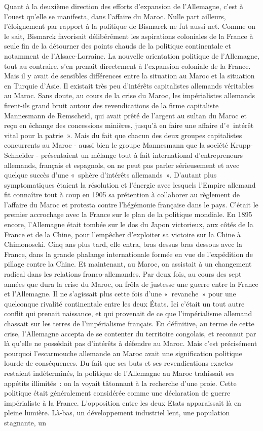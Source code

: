 \documentclass[french,twoside]{book} %
\begin{document}
Quant à la deuxième direction des efforts d’expansion de l’Allemagne, c’est à l’ouest qu’elle se manifesta, dans l’affaire du Maroc. Nulle part ailleurs, l’éloignement par rapport à la politique de Bismarck ne fut aussi net. Comme on le sait, Bismarck favorisait délibérément les aspirations coloniales de la France à seule fin de la détourner des points chauds de la politique continentale et notamment de l’Alsace-Lorraine. La nouvelle orientation politique de l’Allemagne, tout au contraire, s’en prenait directement à l’expansion coloniale de la France. Mais il y avait de sensibles différences entre la situation au Maroc et la situation en Turquie d’Asie. Il existait très peu d’intérêts capitalistes allemands véritables au Maroc. Sans doute, au cours de la crise du Maroc, les impérialistes allemands firent-ils grand bruit autour des revendications de la firme capitaliste Mannesmann de Remscheid, qui avait prêté de l’argent au sultan du Maroc et reçu en échange des concessions minières, jusqu’à en faire une affaire d’« intérêt vital pour la patrie ». Mais du fait que chacun des deux groupes capitalistes concurrents au Maroc - aussi bien le groupe Mannesmann que la société Krupp-Schneider - présentaient un mélange tout à fait international d’entrepreneurs allemands, français et espagnols, on ne peut pas parler sérieusement et avec quelque succès d’une « sphère d’intérêts allemands ». D'autant plus symptomatiques étaient la résolution et l’énergie avec lesquels l’Empire allemand fit connaître tout à coup en 1905 sa prétention à collaborer au règlement de l’affaire du Maroc et protesta contre l’hégémonie française dans le pays. C'était le premier accrochage avec la France sur le plan de la politique mondiale. En 1895 encore, l’Allemagne était tombée sur le dos du Japon victorieux, aux côtés de la France et de la Chine, pour l’empêcher d’exploiter sa victoire sur la Chine à Chimonoseki. Cinq ans plus tard, elle entra, bras dessus bras dessous avec la France, dans la grande phalange internationale formée en vue de l’expédition de pillage contre la Chine. Et maintenant, au Maroc, on assistait à un changement  radical dans les relations franco-allemandes. Par deux fois, au cours des sept années que dura la crise du Maroc, on frôla de justesse une guerre entre la France et l’Allemagne. Il ne s’agissait plus cette fois d’une « revanche » pour une quelconque rivalité continentale entre les deux États. Ici c’était un tout autre conflit qui prenait naissance, et qui provenait de ce que l’impérialisme allemand chassait sur les terres de l’impérialisme français. En définitive, au terme de cette crise, l’Allemagne accepta de se contenter du territoire congolais, et reconnut par là qu’elle ne possédait pas d’intérêts à défendre au Maroc. Mais c’est précisément pourquoi l’escarmouche allemande au Maroc avait une signification politique lourde de conséquences. Du fait que ses buts et ses revendications exactes restaient indéterminés, la politique de l’Allemagne au Maroc trahissait ses appétits illimités : on la voyait tâtonnant à la recherche d’une proie. Cette politique était généralement considérée comme une déclaration de guerre impérialiste à la France. L'opposition entre les deux Etats apparaissait là en pleine lumière. Là-bas, un développement industriel lent, une population stagnante, un 
\end{document}
